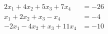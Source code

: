 \begin{align*}
2x_1+4x_2+5x_3+7x_4&=-26\\
x_1+2x_2+x_3-x_4&=-4\\
-2x_1-4x_2+x_3+11x_4&=-10
\end{align*}

